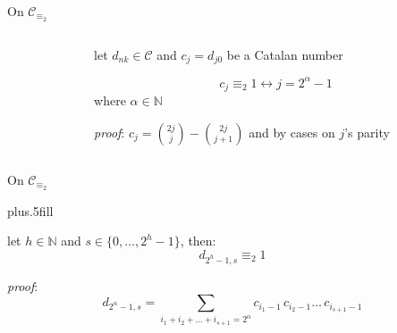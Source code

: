 \documentclass[10pt,serif, professionalfont]{beamer}
\begin{document}
\begin{frame}{On $\mathcal{C}_{\equiv_{2}}$}
    \begin{columns}[T] %
        \begin{column}[T]{5cm} %
            
        \end{column}
        \begin{column}[T]{5cm} %
            let $d_{nk}\in\mathcal{C}$ and $c_{j}=d_{j0}$ be a Catalan number
            \begin{theorem}
                \begin{displaymath}
                    c_{j} \equiv_{2}1 \leftrightarrow j=2^{\alpha}-1
                \end{displaymath}
                where $\alpha\in\mathbb{N}$
            \end{theorem}
            \emph{proof}: $c_{j} = {{2j}\choose{j}} - {{2j}\choose{j+1}}$ and by cases on $j$'s parity
        \end{column}
    \end{columns}
\end{frame}

\begin{frame}{On $\mathcal{C}_{\equiv_{2}}$}

      \vskip-20pt plus.5fill
    \begin{theorem}
        let $h\in\mathbb{N}$ and $s\in\lbrace0,\ldots,2^{h}-1 \rbrace$, then:
        \begin{displaymath}
            d_{2^{h}-1,s} \equiv_{2} 1
        \end{displaymath}
    \end{theorem}
    \emph{proof}: 
        \begin{displaymath}
            d_{2^{\alpha}-1,s} = \sum_{i_{1}+i_{2}+\ldots+i_{s+1}=2^{\alpha}}
                {c_{i_{1}-1}\,c_{i_{2}-1}\ldots\,c_{i_{s+1}-1}}
        \end{displaymath}

    
\end{frame}
\end{document}
